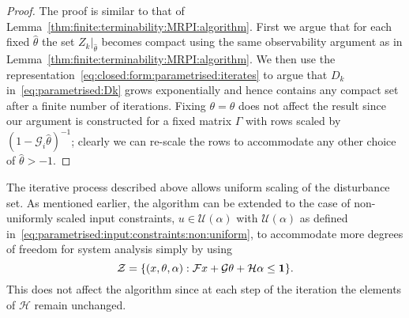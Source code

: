 %
\begin{proof}
The proof is similar to that of Lemma~\ref{thm:finite:terminability:MRPI:algorithm}.
%
First we argue that for each fixed $\hat\theta$ the set $Z_k\vert_{\hat\theta}$ becomes compact using the same
observability argument as in Lemma~\ref{thm:finite:terminability:MRPI:algorithm}.
%
We then use the representation~\eqref{eq:closed:form:parametrised:iterates} to argue that $D_k$ 
in~\eqref{eq:parametrised:Dk} grows exponentially and hence contains any compact set after a finite number
of iterations. 
%
Fixing $\theta=\hat\theta$ does not affect the result since our argument is constructed for a fixed 
matrix $\Gamma$ with rows scaled by $(1-\mathcal G_i\hat\theta)^{-1}$; clearly we can re-scale the 
rows to accommodate any other choice of $\hat\theta>-1$.
\end{proof}

The iterative process described above allows uniform scaling of the disturbance set. 
%
As mentioned earlier, the algorithm can be extended to the case of non-uniformly scaled input constraints, 
$u \in \mathcal U(\alpha)$ with $\mathcal U(\alpha)$ as defined in~\eqref{eq:parametrised:input:constraints:non:uniform},
to accommodate more degrees of freedom for system analysis simply by using 
%
\[
\mathcal Z = \{(x,\theta,\alpha): \mathcal F x + \mathcal G\theta + 
\mathcal H \alpha \leq {\bf{1}}\}.
\]
%
This does not affect the algorithm since at each step of the iteration 
the elements of $\mathcal H$ remain unchanged. 
%
%
%
%
%
